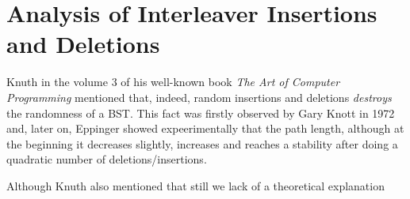 \section{Analysis of Interleaver Insertions and Deletions}
Knuth in the volume $3$ of his well-known book \textit{The Art of Computer Programming} \cite{knuth1998art} mentioned that, indeed, random insertions and deletions \textit{destroys} the randomness of a BST. This fact was firstly observed by Gary Knott in 1972 and, later on, Eppinger \cite{eppinger1983empirical} showed expeerimentally that the path length, although at the beginning it decreases slightly, increases and reaches a stability after doing a quadratic number of deletions/insertions.

Although Knuth also mentioned that still we lack of a theoretical explanation
